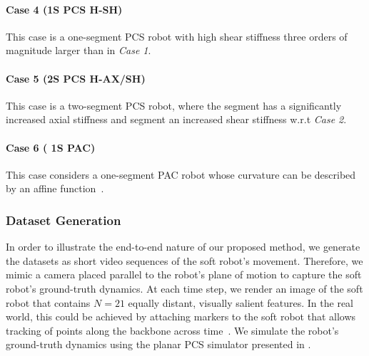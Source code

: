 \paragraph{Case 4 (1S PCS H-SH)}
This case is a one-segment \gls{PCS} robot with high shear stiffness three orders of magnitude larger than in \emph{Case 1}.

\paragraph{Case 5 (2S PCS H-AX/SH)}
This case is a two-segment \gls{PCS} robot, where the  segment has a significantly increased axial stiffness and  segment an increased shear stiffness w.r.t \emph{Case 2}.

\paragraph{Case 6 ( 1S PAC)} This case considers a one-segment \gls{PAC} robot whose curvature can be described by an affine function~\citep{stella2023piecewise}.



\subsubsection{Dataset Generation}
In order to illustrate the end-to-end nature of our proposed method, we generate the datasets as short video sequences of the soft robot's movement. 
Therefore, we mimic a camera placed parallel to the robot's plane of motion to capture the soft robot's ground-truth dynamics.
At each time step, we render an image of the soft robot that contains $N=21$ equally distant, visually salient features. In the real world, this could be achieved by attaching markers to the soft robot that allows tracking of points along the backbone across time~\citep{stella2022experimental}.
We simulate the robot's ground-truth dynamics using the planar \gls{PCS} simulator presented in \citep{stolzle2024experimental}.

